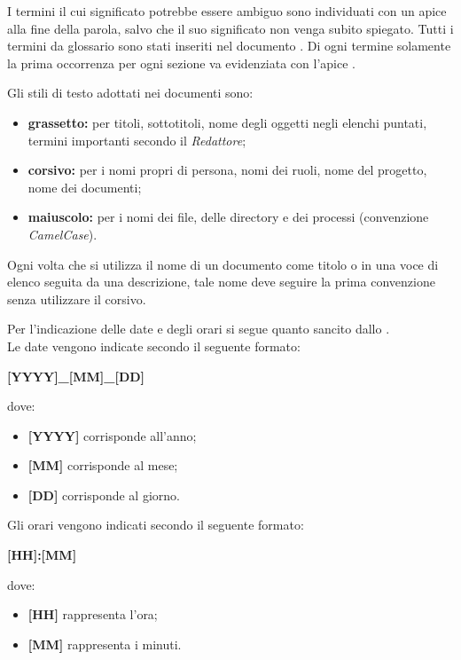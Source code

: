I termini il cui significato potrebbe essere ambiguo sono individuati con un apice  alla fine della parola, salvo che il suo significato non venga subito spiegato. Tutti i termini da glossario sono stati inseriti nel documento \textit{\Glossario}. Di ogni termine solamente la prima occorrenza per ogni sezione va evidenziata con l'apice .

Gli stili di testo adottati nei documenti sono:
\begin{itemize}
	\item \textbf{grassetto:} per titoli, sottotitoli, nome degli oggetti negli elenchi puntati, termini importanti secondo il \textit{Redattore};
	\item \textbf{corsivo:} per i nomi propri di persona, nomi dei ruoli, nome del progetto, nome dei documenti;
	\item \textbf{maiuscolo:} per i nomi dei file, delle directory e dei processi (convenzione \textit{CamelCase}).	
\end{itemize}
Ogni volta che si utilizza il nome di un documento come titolo o in una voce di elenco seguita da una descrizione, tale nome deve seguire la prima convenzione senza utilizzare il corsivo.

Per l'indicazione delle date e degli orari si segue quanto sancito dallo  .\\
Le date vengono indicate secondo il seguente formato:
\begin{center}
	\textbf{[YYYY]\_[MM]\_[DD]} 
\end{center}
dove:
\begin{itemize}
	\item \textbf{[YYYY]} corrisponde all'anno;
	\item \textbf{[MM]} corrisponde al mese;
	\item \textbf{[DD]} corrisponde al giorno.
\end{itemize}
Gli orari vengono indicati secondo il seguente formato:
\begin{center}
	\textbf{[HH]:[MM]} 
\end{center}
dove:
\begin{itemize}
	\item \textbf{[HH]} rappresenta l'ora;
	\item \textbf{[MM]} rappresenta i minuti.
\end{itemize}

